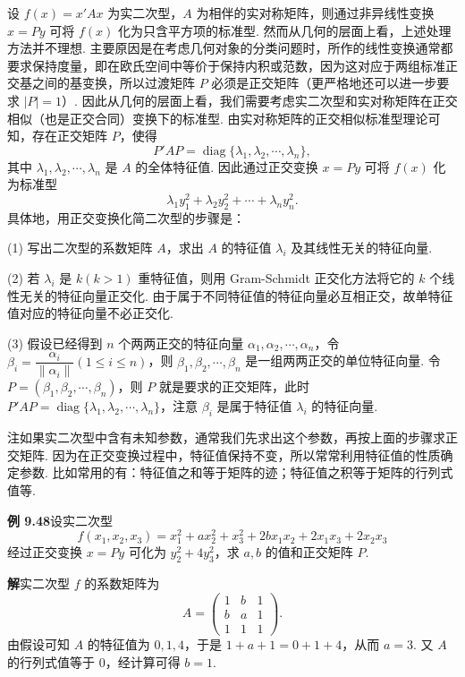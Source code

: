 \documentclass[UTF8, 12pt, fontset=fandol, oneside]{ctexart}
\begin{document}
设 $f(x)=x'Ax$ 为实二次型，$A$ 为相伴的实对称矩阵，则通过非异线性变换 $x=Py$ 可将 $f(x)$ 化为只含平方项的标准型. 然而从几何的层面上看，上述处理方法并不理想. 主要原因是在考虑几何对象的分类问题时，所作的线性变换通常都要求保持度量，即在欧氏空间中等价于保持内积或范数，因为这对应于两组标准正交基之间的基变换，所以过渡矩阵 $P$ 必须是正交矩阵（更严格地还可以进一步要求 $|P|=1$）. 因此从几何的层面上看，我们需要考虑实二次型和实对称矩阵在正交相似（也是正交合同）变换下的标准型. 由实对称矩阵的正交相似标准型理论可知，存在正交矩阵 $P$，使得
\[
P'AP=\operatorname{diag}\{\lambda_1,\lambda_2,\cdots,\lambda_n\},
\]
其中 $\lambda_1,\lambda_2,\cdots,\lambda_n$ 是 $A$ 的全体特征值. 因此通过正交变换 $x=Py$ 可将 $f(x)$ 化为标准型
\begin{equation}
\lambda_1y_1^2+\lambda_2y_2^2+\cdots+\lambda_ny_n^2.
\tag{9.10}
\end{equation}
具体地，用正交变换化简二次型的步骤是：

(1) 写出二次型的系数矩阵 $A$，求出 $A$ 的特征值 $\lambda_i$ 及其线性无关的特征向量.

(2) 若 $\lambda_i$ 是 $k(k>1)$ 重特征值，则用 Gram-Schmidt 正交化方法将它的 $k$ 个线性无关的特征向量正交化. 由于属于不同特征值的特征向量必互相正交，故单特征值对应的特征向量不必正交化.

(3) 假设已经得到 $n$ 个两两正交的特征向量 $\alpha_1,\alpha_2,\cdots,\alpha_n$，令 $\beta_i=\dfrac{\alpha_i}{\|\alpha_i\|}(1\le i\le n)$，则 $\beta_1,\beta_2,\cdots,\beta_n$ 是一组两两正交的单位特征向量. 令 $P=(\beta_1,\beta_2,\cdots,\beta_n)$，则 $P$ 就是要求的正交矩阵，此时 $P'AP=\operatorname{diag}\{\lambda_1,\lambda_2,\cdots,\lambda_n\}$，注意 $\beta_i$ 是属于特征值 $\lambda_i$ 的特征向量.

注\quad 如果实二次型中含有未知参数，通常我们先求出这个参数，再按上面的步骤求正交矩阵. 因为在正交变换过程中，特征值保持不变，所以常常利用特征值的性质确定参数. 比如常用的有：特征值之和等于矩阵的迹；特征值之积等于矩阵的行列式值等.

\noindent\textbf{例 9.48}\quad 设实二次型
\[
f(x_1,x_2,x_3)=x_1^2+ax_2^2+x_3^2+2bx_1x_2+2x_1x_3+2x_2x_3
\]
经过正交变换 $x=Py$ 可化为 $y_2^2+4y_3^2$，求 $a,b$ 的值和正交矩阵 $P$.

\noindent\textbf{解}\quad 实二次型 $f$ 的系数矩阵为
\[
A=\begin{pmatrix}
1&b&1\\
b&a&1\\
1&1&1
\end{pmatrix}.
\]
由假设可知 $A$ 的特征值为 $0,1,4$，于是 $1+a+1=0+1+4$，从而 $a=3$. 又 $A$ 的行列式值等于 0，经计算可得 $b=1$.
\end{document}
